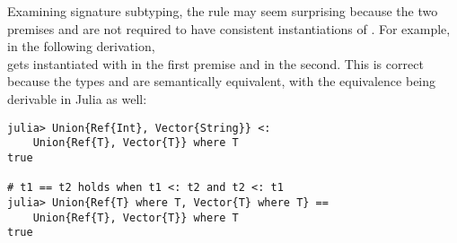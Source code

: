 Examining signature subtyping,
the rule  may seem surprising because the two premises
 and
 are not required
to have consistent instantiations of \UEnv.
For example, in the following derivation,\\
\va gets instantiated with \tyint in the first premise and
\tystr in the second.
This is correct because the types
 and
are semantically equivalent, with the equivalence being derivable in Julia
as well:
\begin{center}
\begin{minipage}{8cm}
\begin{lstlisting}
julia> Union{Ref{Int}, Vector{String}} <: 
    Union{Ref{T}, Vector{T}} where T
true

# t1 == t2 holds when t1 <: t2 and t2 <: t1
julia> Union{Ref{T} where T, Vector{T} where T} == 
    Union{Ref{T}, Vector{T}} where T
true
\end{lstlisting}
\end{minipage}
\end{center}

